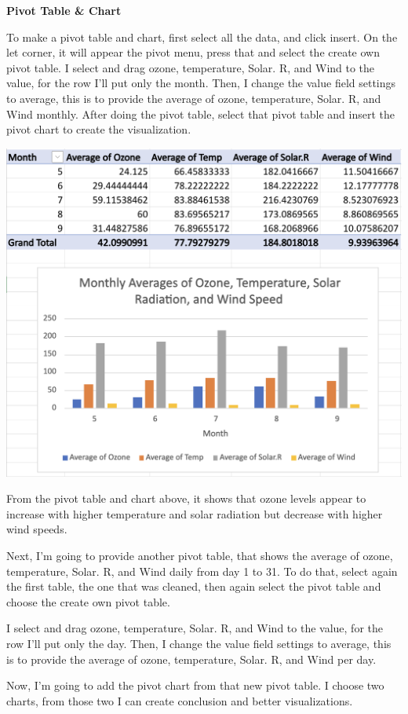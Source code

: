 \documentclass[
  letterpaper,
  DIV=11,
  numbers=noendperiod]{scrreprt}
\begin{document}
\textbf{Pivot Table \& Chart}

To make a pivot table and chart, first select all the data, and click
insert. On the let corner, it will appear the pivot menu, press that and
select the create own pivot table. I select and drag ozone, temperature,
Solar. R, and Wind to the value, for the row I'll put only the month.
Then, I change the value field settings to average, this is to provide
the average of ozone, temperature, Solar. R, and Wind monthly. After
doing the pivot table, select that pivot table and insert the pivot
chart to create the visualization.

\includegraphics{./pivot1.png}

From the pivot table and chart above, it shows that ozone levels appear
to increase with higher temperature and solar radiation but decrease
with higher wind speeds.

Next, I'm going to provide another pivot table, that shows the average
of ozone, temperature, Solar. R, and Wind daily from day 1 to 31. To do
that, select again the first table, the one that was cleaned, then again
select the pivot table and choose the create own pivot table.

I select and drag ozone, temperature, Solar. R, and Wind to the value,
for the row I'll put only the day. Then, I change the value field
settings to average, this is to provide the average of ozone,
temperature, Solar. R, and Wind per day.

Now, I'm going to add the pivot chart from that new pivot table. I
choose two charts, from those two I can create conclusion and better
visualizations.
\end{document}
